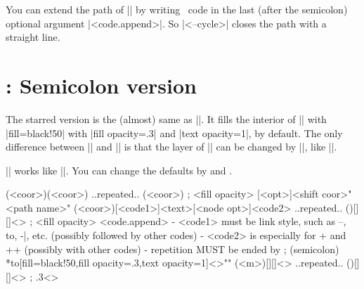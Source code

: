 \begin{tzcode}{.3}
{}
\end{tzcode}

\begin{tzcode}{.3}
{}
\end{tzcode}

You can extend the path of |\tzpath| by writing \Tikz\ code in the last (after the semicolon) optional argument |<code.append>|.
So |<--cycle>| closes the path with a straight line.

\begin{tzcode}{.3}
\end{tzcode}

\section{\protect\cmd{\tzpath*}: Semicolon version}
\label{s:tzpath*}

The starred version \icmd{\tzpath*} is the (almost) same as |\tzlinks*[draw=none]|. It fills the interior of |\tzpath| with |fill=black!50| with |fill opacity=.3| and |text opacity=1|, by default.
The only difference between |\tzpath*| and |\tzlinks*[draw=none]| is that the layer of |\tzpath*| can be changed by |\settzpathlayer|, like ||.

|\tzpath*| works like |\tzpath[fill=black!50,fill opacity=.3,text opacity=1]|.
You can change the defaults by \icmd{\settzfillcolor} and \icmd{\settzfillopacity}.

\begin{tzdef}
\tzpath*(<coor>)(<coor>) ..repeated.. (<coor>) ; {<fill opacity>}
[<opt>]<shift coor>"<path name>"
        (<coor>)[<code1>]{<text>}[<node opt>]<code2>
        ..repeated.. ()[]{}[]<> ; {<fill opacity>} <code.append>
  - <code1> must be link style, such as --, to, -|, etc.
           (possibly followed by other codes)
  - <code2> is especially for + and ++
           (possibly with other codes)
  - repetition MUST be ended by ; (semicolon)
 *{to}[fill=black!50,fill opacity=.3,text opacity=1]<>""
  (<m>)[]{}[]<> ..repeated.. ()[]{}[]<> ; {.3}<>
\end{tzdef}



